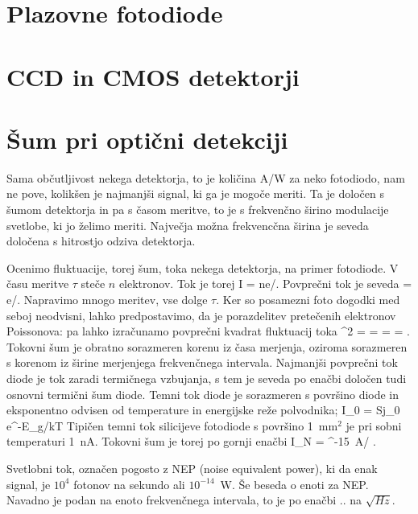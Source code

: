 \section{Plazovne fotodiode}
 
\section{CCD in CMOS detektorji}
 
\section{Šum pri optični detekciji}
Sama občutljivost nekega detektorja, to je količina A/W za neko fotodiodo, nam ne pove, kolikšen 
je najmanjši signal, ki ga je mogoče meriti. Ta je določen s šumom detektorja in pa s časom 
meritve, to je s frekvenčno širino modulacije svetlobe, ki jo želimo meriti. Največja 
možna frekvencčna širina je seveda določena s hitrostjo odziva detektorja.

Ocenimo fluktuacije, torej šum, toka nekega detektorja, na primer fotodiode. V času
meritve $\tau$ steče $n$ elektronov. Tok je torej
\beq
I = ne/\tau.
\eeq
Povprečni tok je seveda
\beq
{} = e/\tau.
\eeq
Napravimo mnogo meritev, vse dolge $\tau$. Ker so posamezni foto dogodki med seboj neodvisni, 
lahko predpostavimo, da je porazdelitev pretečenih elektronov Poissonova: pa lahko izračunamo
povprečni kvadrat fluktuacij toka
\beq
\sigma^2 =  =   = 
 = .
\eeq
Tokovni šum je obratno sorazmeren korenu iz časa merjenja, oziroma sorazmeren s korenom
iz širine merjenjega frekvenčnega intervala. Najmanjši povprečni tok diode je tok zaradi
termičnega vzbujanja, s tem je seveda po enačbi določen tudi osnovni termični šum diode.
Temni tok diode je sorazmeren s površino diode in eksponentno odvisen od temperature in 
energijske reže polvodnika;
\beq
I_0 = Sj_0 e^{-E_g/kT}
\eeq
Tipičen temni tok silicijeve fotodiode s površino 1~mm$^2$ je pri sobni temperaturi 1~nA. 
Tokovni šum je torej po gornji enačbi
\beq
I_N =  ^{-15}~A/ \sqrt{\Delta \nu}.
\eeq

Svetlobni tok, označen pogosto z NEP (noise equivalent power), ki da enak signal, je $10^4 $
fotonov na sekundo ali $10^{-14}$~W. Še beseda o enoti za NEP. Navadno je podan na enoto 
frekvenčnega intervala, to je po enačbi .. na $\sqrt{Hz}$. 